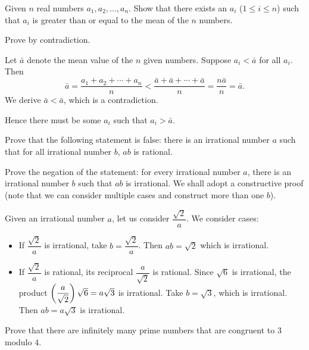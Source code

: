\begin{exercise}
Given $n$ real numbers $a_1,a_2,\dots,a_n$. Show that there exists an $a_i$ ($1\le i\le n$) such that $a_i$ is greater than or equal to the mean of the $n$ numbers.
\end{exercise}

\begin{solution}
Prove by contradiction.

Let $\bar{a}$ denote the mean value of the $n$ given numbers. Suppose $a_i<\bar{a}$ for all $a_i$. Then
\[ \bar{a}=\frac{a_1+a_2+\cdots+a_n}{n}<\frac{\bar{a}+\bar{a}+\cdots+\bar{a}}{n}=\frac{n\bar{a}}{n}=\bar{a}. \]
We derive $\bar{a}<\bar{a}$, which is a contradiction.

Hence there must be some $a_i$ such that $a_i>\bar{a}$.
\end{solution}

\begin{exercise}
Prove that the following statement is false: there is an irrational number $a$ such that for all irrational number $b$, $ab$ is rational.
\end{exercise}

\begin{idea}
Prove the negation of the statement: for every irrational number $a$, there is an irrational number $b$ such that $ab$ is irrational. We shall adopt a constructive proof (note that we can consider multiple cases and construct more than one $b$).
\end{idea}

\begin{solution}
Given an irrational number $a$, let us consider $\dfrac{\sqrt{2}}{a}$. We consider cases:
\begin{itemize}
\item If $\dfrac{\sqrt{2}}{a}$ is irrational, take $b=\dfrac{\sqrt{2}}{a}$. Then $ab=\sqrt{2}$ which is irrational.
\item If $\dfrac{\sqrt{2}}{a}$ is rational, its reciprocal $\dfrac{a}{\sqrt{2}}$ is rational. Since $\sqrt{6}$ is irrational, the product $\left(\dfrac{a}{\sqrt{2}}\right)\sqrt{6}=a\sqrt{3}$ is irrational. Take $b=\sqrt{3}$, which is irrational. Then $ab=a\sqrt{3}$ is irrational.
\end{itemize}
\end{solution}

\begin{exercise}
Prove that there are infinitely many prime numbers that are congruent to $3$ modulo $4$.
\end{exercise}

